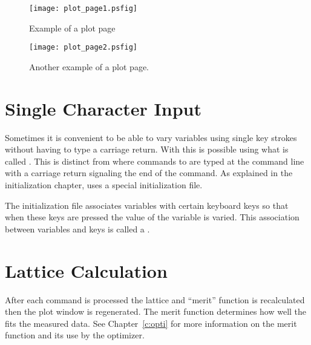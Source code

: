 \begin{figure}
  \centering
  \texttt{[image: plot\_page1.psfig]}
  \caption{Example of a plot page}
  \label{f:plot_page1}
\end{figure}

\begin{figure}
  \centering
  \texttt{[image: plot\_page2.psfig]}
  \caption{Another example of a plot page.}
  \label{f:plot_page2}
\end{figure}

\vfill
\break
\section{Single Character Input}

Sometimes it is convenient to be able to vary variables using single
key strokes without having to type a carriage return.  With \tao this
is possible using what is called . This is distinct
from  where commands to \tao are typed at the command
line with a carriage return signaling the end of the command. As
explained in the initialization chapter,  uses a
special initialization file.

The  initialization file associates variables with
certain keyboard keys so that when these keys are pressed the value of
the variable is varied. This association between variables and keys is
called a .


\section{Lattice Calculation}

After each \tao command is processed the lattice and ``merit'' function is 
recalculated then the plot window is regenerated. The
merit function determines how well the  fits the measured data. See
Chapter~\ref{c:opti} for more information on the merit function and its use by
the optimizer. 

